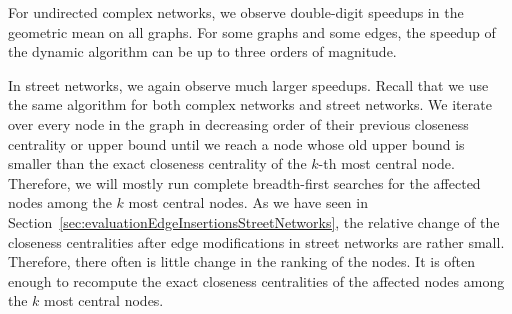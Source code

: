 For undirected complex networks, we observe double-digit speedups in the geometric mean on all graphs. For some graphs and some edges, the speedup of the dynamic algorithm can be up to three orders of magnitude.

In street networks, we again observe much larger speedups. Recall that we use the same algorithm for both complex networks and street networks. We iterate over every node in the graph in decreasing order of their previous closeness centrality or upper bound until we reach a node whose old upper bound is smaller than the exact closeness centrality of the $k$-th most central node. Therefore, we will mostly run complete breadth-first searches for the affected nodes among the $k$ most central nodes. As we have seen in Section~\ref{sec:evaluationEdgeInsertionsStreetNetworks}, the relative change of the closeness centralities after edge modifications in street networks are rather small. Therefore, there often is little change in the ranking of the nodes. It is often enough to recompute the exact closeness centralities of the affected nodes among the $k$ most central nodes.

